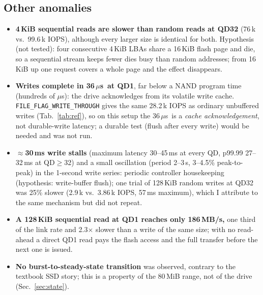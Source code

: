 ﻿\documentclass[10.5pt]{article}
\newcommand{\us}{\,$\mu$s}
\begin{document}
\subsection{Other anomalies}
\begin{itemize}
  \item \textbf{4\,KiB sequential reads are slower than random reads at QD32} (76\,k vs.\ 99.6\,k IOPS), although every larger size is identical for both. Hypothesis (not tested): four consecutive 4\,KiB LBAs share a 16\,KiB flash page and die, so a sequential stream keeps fewer dies busy than random addresses; from 16\,KiB up one request covers a whole page and the effect disappears.
  \item \textbf{Writes complete in 36\us\ at QD1}, far below a NAND program time (hundreds of $\mu$s): the drive acknowledges from its volatile write cache. \texttt{FILE\_FLAG\_WRITE\_THROUGH} gives the same 28.2\,k IOPS as ordinary unbuffered writes (Tab.~\ref{tab:ref}), so on this setup the 36\us\ is a \emph{cache acknowledgement}, not durable-write latency; a durable test (flush after every write) would be needed and was not run.
  \item \textbf{$\approx$30\,ms write stalls} (maximum latency 30--45\,ms at every QD, p99.99 27--32\,ms at QD$\ge$32) and a small oscillation (period 2--3\,s, 3--4.5\% peak-to-peak) in the 1-second write series: periodic controller housekeeping (hypothesis: write-buffer flush); one trial of 128\,KiB random writes at QD32 was 25\% slower (2.9\,k vs.\ 3.86\,k IOPS, 57\,ms maximum), which I attribute to the same mechanism but did not repeat.
  \item \textbf{A 128\,KiB sequential read at QD1 reaches only 186\,MB/s,} one third of the link rate and 2.3$\times$ slower than a write of the same size; with no read-ahead a direct QD1 read pays the flash access and the full transfer before the next one is issued.
  \item \textbf{No burst-to-steady-state transition} was observed, contrary to the textbook SSD story; this is a property of the 80\,MiB range, not of the drive (Sec.~\ref{sec:state}).
\end{itemize}
\end{document}
